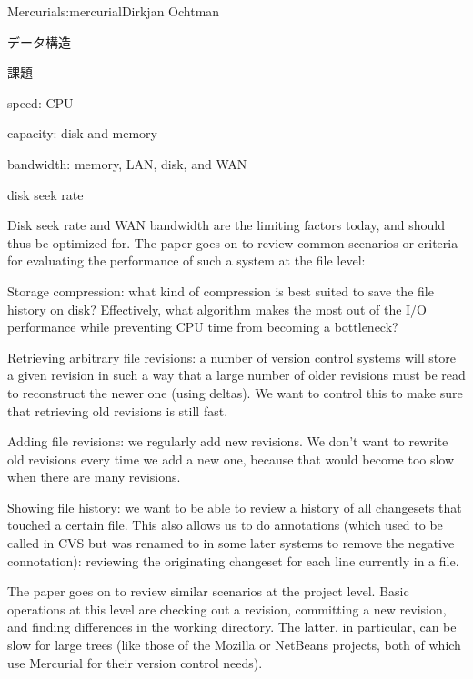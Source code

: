 \begin{aosachapter}{Mercurial}{s:mercurial}{Dirkjan Ochtman}
\begin{aosasect1}{データ構造}
\begin{aosasect2}{課題}
\begin{aosaitemize}

  \item speed: CPU

  \item capacity: disk and memory

  \item bandwidth: memory, LAN, disk, and WAN

  \item disk seek rate

\end{aosaitemize}

Disk seek rate and WAN bandwidth are the limiting factors today, and
should thus be optimized for. The paper goes on to review common
scenarios or criteria for evaluating the performance of such a system
at the file level:

\begin{aosaitemize}

  \item Storage compression: what kind of compression is best suited
  to save the file history on disk? Effectively, what algorithm makes
  the most out of the I/O performance while preventing CPU time
  from becoming a bottleneck?

  \item Retrieving arbitrary file revisions: a number of version control
  systems will store a given revision in such a way that a large
  number of older revisions must be read to reconstruct the newer one
  (using deltas). We want to control this to make sure that retrieving
  old revisions is still fast.

  \item Adding file revisions: we regularly add new revisions. We don't
  want to rewrite old revisions every time we add a new one, because
  that would become too slow when there are many revisions.

  \item Showing file history: we want to be able to review a history of
  all changesets that touched a certain file. This also allows us to
  do annotations (which used to be called  in CVS but was
  renamed to  in some later systems to remove the
  negative connotation): reviewing the originating changeset for each
  line currently in a file.

\end{aosaitemize}

The paper goes on to review similar scenarios at the project level.
Basic operations at this level are checking out a revision, committing
a new revision, and finding differences in the working directory. The
latter, in particular, can be slow for large trees (like those of the
Mozilla or NetBeans projects, both of which use Mercurial for their
version control needs).


\end{aosasect2}
\end{aosasect1}
\end{aosachapter}

